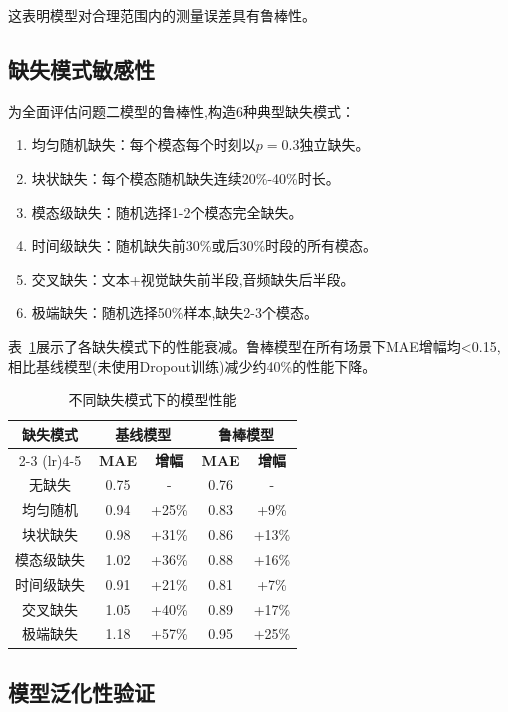 这表明模型对合理范围内的测量误差具有鲁棒性。

\subsection{缺失模式敏感性}

为全面评估问题二模型的鲁棒性,构造6种典型缺失模式：

\begin{enumerate}
\item 均匀随机缺失：每个模态每个时刻以$p=0.3$独立缺失。
\item 块状缺失：每个模态随机缺失连续20\%-40\%时长。
\item 模态级缺失：随机选择1-2个模态完全缺失。
\item 时间级缺失：随机缺失前30\%或后30\%时段的所有模态。
\item 交叉缺失：文本+视觉缺失前半段,音频缺失后半段。
\item 极端缺失：随机选择50\%样本,缺失2-3个模态。
\end{enumerate}

表~\ref{tab:sensitivity_missing}展示了各缺失模式下的性能衰减。鲁棒模型在所有场景下MAE增幅均<0.15,相比基线模型(未使用Dropout训练)减少约40\%的性能下降。

\begin{table}[htbp]
\centering
\caption{不同缺失模式下的模型性能}
\label{tab:sensitivity_missing}
\begin{tabular}{c|cc|cc}
\toprule
\textbf{缺失模式} & \multicolumn{2}{c|}{\textbf{基线模型}} & \multicolumn{2}{c}{\textbf{鲁棒模型}} \\
\cmidrule(lr){2-3} \cmidrule(lr){4-5}
& \textbf{MAE} & \textbf{增幅} & \textbf{MAE} & \textbf{增幅} \\
\midrule
无缺失 & 0.75 & - & 0.76 & - \\
均匀随机 & 0.94 & +25\% & 0.83 & +9\% \\
块状缺失 & 0.98 & +31\% & 0.86 & +13\% \\
模态级缺失 & 1.02 & +36\% & 0.88 & +16\% \\
时间级缺失 & 0.91 & +21\% & 0.81 & +7\% \\
交叉缺失 & 1.05 & +40\% & 0.89 & +17\% \\
极端缺失 & 1.18 & +57\% & 0.95 & +25\% \\
\bottomrule
\end{tabular}
\end{table}

\subsection{模型泛化性验证}

